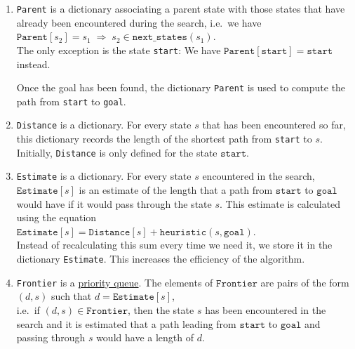 \begin{enumerate}
\item \texttt{Parent} is a dictionary associating a parent state with those states that have already been
      encountered during the search, i.e.~we have
      \\[0.2cm]
      \hspace*{1.3cm}
      $\mathtt{Parent}[s_2] = s_1 \;\Rightarrow\; s_2 \in \mathtt{next\_states}(s_1)$.
      \\[0.2cm]
      The only exception is the state \texttt{start}:  We have 
      $\mathtt{Parent}[\mathtt{start}] = \mathtt{start}$ instead. 

      Once the goal has been found, the dictionary \texttt{Parent} is used to compute the path from
      \texttt{start} to \texttt{goal}.
\item \texttt{Distance} is a dictionary.  For every state $s$ that has been encountered so far,  this
      dictionary records the length of the shortest path from \texttt{start} to $s$. 
      Initially, \texttt{Distance} is only defined for the state $\texttt{start}$.
\item \texttt{Estimate} is a dictionary.  For every state $s$ encountered in the search, $\mathtt{Estimate}[s]$
      is an estimate of the length that a path from $\texttt{start}$ to $\texttt{goal}$ would have if it would
      pass through the state $s$.  This estimate is calculated using the equation
      \\[0.2cm]
      \hspace*{1.3cm}
      $\mathtt{Estimate}[s] = \mathtt{Distance}[s] + \mathtt{heuristic}(s, \mathtt{goal})$.
      \\[0.2cm]
      Instead of recalculating this sum every time we need it, we store it in the dictionary
      \texttt{Estimate}.  This increases the efficiency of the algorithm.
\item \texttt{Frontier} is a \href{https://en.wikipedia.org/wiki/Priority_queue}{priority queue}.
      The elements of $\texttt{Frontier}$ are pairs of the form
      \\[0.2cm]
      \hspace*{1.3cm}
      $(d, s)$ \quad such that \quad $d = \mathtt{Estimate}[s]$,
      \\[0.2cm]
      i.e.~if $(d, s) \in \mathtt{Frontier}$, then the state $s$ has been encountered in the search and it is
      estimated that a path leading from $\texttt{start}$ to $\texttt{goal}$ and passing through $s$ would have
      a length of $d$.


\end{enumerate}

